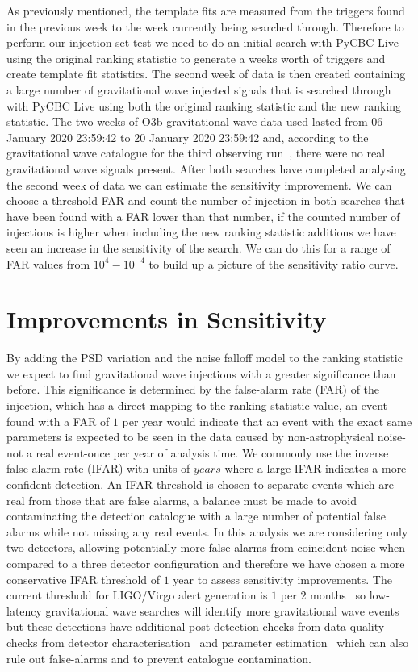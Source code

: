 As previously mentioned, the template fits are measured from the triggers found in the previous week to the week currently being searched through. Therefore to perform our injection set test we need to do an initial search with PyCBC Live using the original ranking statistic to generate a weeks worth of triggers and create template fit statistics. The second week of data is then created containing a large number of gravitational wave injected signals that is searched through with PyCBC Live using both the original ranking statistic and the new ranking statistic. The two weeks of O3b gravitational wave data used lasted from 06 January 2020 23:59:42 to 20 January 2020 23:59:42 and, according to the gravitational wave catalogue for the third observing run~\cite{gwtc3:2023}, there were no real gravitational wave signals present. After both searches have completed analysing the second week of data we can estimate the sensitivity improvement. We can choose a threshold FAR and count the number of injection in both searches that have been found with a FAR lower than that number, if the counted number of injections is higher when including the new ranking statistic additions we have seen an increase in the sensitivity of the search. We can do this for a range of FAR values from $10^{4} - 10^{-4}$ to build up a picture of the sensitivity ratio curve.

\section{\label{5:sec:sensitivity-improvements}Improvements in Sensitivity}

By adding the PSD variation and the noise falloff model to the ranking statistic we expect to find gravitational wave injections with a greater significance than before. This significance is determined by the false-alarm rate (FAR) of the injection, which has a direct mapping to the ranking statistic value, an event found with a FAR of $1$ per year would indicate that an event with the exact same parameters is expected to be seen in the data caused by non-astrophysical noise-not a real event-once per year of analysis time. We commonly use the inverse false-alarm rate (IFAR) with units of $years$ where a large IFAR indicates a more confident detection. An IFAR threshold is chosen to separate events which are real from those that are false alarms, a balance must be made to avoid contaminating the detection catalogue with a large number of potential false alarms while not missing any real events. In this analysis we are considering only two detectors, allowing potentially more false-alarms from coincident noise when compared to a three detector configuration and therefore we have chosen a more conservative IFAR threshold of $1$ year to assess sensitivity improvements. The current threshold for LIGO/Virgo alert generation is $1$ per $2$ months~\cite{PyCBC_Live:2018} so low-latency gravitational wave searches will identify more gravitational wave events but these detections have additional post detection checks from data quality checks from detector characterisation~\cite{O2O3_DetChar:2021} and parameter estimation~\cite{gwtc3:2023} which can also rule out false-alarms and to prevent catalogue contamination.

